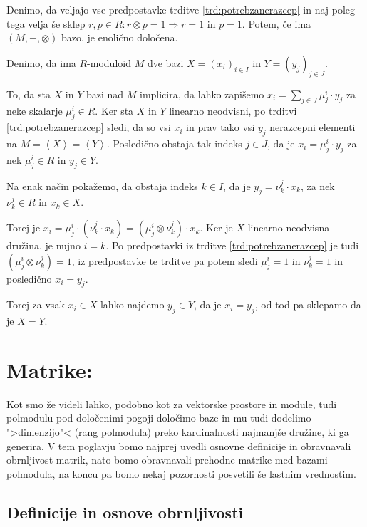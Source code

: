 \documentclass[mat1]{fmfdelo}
\newcommand{\Gen}[1]{\ensuremath{\left<{#1}\right>}}
\begin{document}
\begin{trditev}
	\label{trd:enoličbaza}
	Denimo, da veljajo vse predpostavke trditve \ref{trd:potrebzanerazcep} in naj poleg tega velja še sklep $r, p\in R: r\otimes p = 1\Rightarrow r = 1$ in $p = 1$. Potem, če ima $(M, +, \otimes)$ bazo, je enolično določena.
\end{trditev}

\begin{dokaz}
	Denimo, da ima $R$-moduloid $M$ dve bazi $X=(x_i)_{i\in I}$ in $Y=(y_j)_{j \in J}$. 
	
	To, da sta $X$ in $Y$ bazi nad $M$ implicira, da lahko zapišemo $x_i = \sum_{j\in J}\mu_j^i\cdot y_j$ za neke skalarje $\mu_j^i \in R$.
	Ker sta $X$ in $Y$ linearno neodvisni, po trditvi \ref{trd:potrebzanerazcep} sledi, da so vsi $x_i$ in prav tako vsi $y_j$ nerazcepni elementi na $M = \Gen{X} = \Gen{Y}$. Posledično obstaja tak indeks $j\in J$, da je $x_i = \mu_j^i \cdot y_j$ za nek $\mu_j^i \in R$ in $y_j\in Y$.
	
	Na enak način pokažemo, da obstaja indeks $k\in I$, da je $y_j = \nu_k^j \cdot x_k$, za nek $\nu_k^j \in R$ in $x_k \in X$.

	Torej je $x_i = \mu_j^i \cdot (\nu_k^j \cdot x_k) = (\mu_j^i \otimes \nu_k^j) \cdot x_k$. Ker je $X$ linearno neodvisna družina, je nujno $i = k$. Po predpostavki iz trditve \ref{trd:potrebzanerazcep} je tudi $(\mu_j^i \otimes \nu_k^j) = 1$, iz predpostavke te trditve pa potem sledi $\mu_j^i = 1$ in $\nu_k^j = 1$ in posledično $x_i = y_j$.
	
	Torej za vsak $x_i\in X$ lahko najdemo $y_j\in Y$, da je $x_i = y_j$, od tod pa sklepamo da je $X = Y$.
\end{dokaz}

\section{Matrike:}
Kot smo že videli lahko, podobno kot za vektorske prostore in module, tudi polmodulu pod določenimi pogoji določimo baze in mu tudi dodelimo ">dimenzijo"< (rang polmodula) preko kardinalnosti najmanjše družine, ki ga generira. V tem poglavju bomo najprej uvedli osnovne definicije in obravnavali obrnljivost matrik, nato bomo obravnavali prehodne matrike med bazami polmodula, na koncu pa bomo nekaj pozornosti posvetili še lastnim vrednostim.

\subsection{Definicije in osnove obrnljivosti}\label{subsect:definv}
\end{document}
